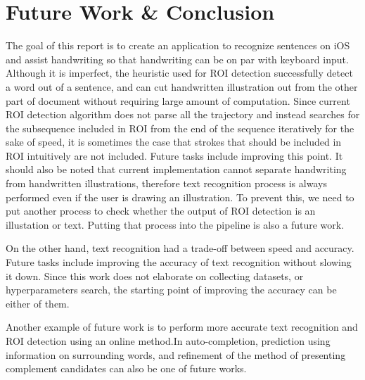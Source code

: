 \section{Future Work \& Conclusion}
\label{section:conclusion}

The goal of this report is to create an application to recognize sentences on iOS
and assist handwriting so that handwriting can be on par with keyboard input.
Although it is imperfect, the heuristic used for ROI detection successfully
detect a word out of a sentence, and can cut handwritten illustration out from the other
part of document without requiring large amount of computation. Since current ROI detection
algorithm does not parse all the trajectory and instead searches for the subsequence included
in ROI from the end of the sequence iteratively for the sake of speed, it is sometimes the case
that strokes that should be included in ROI intuitively are not included.
Future tasks include improving this point.
It should also be noted that current implementation cannot separate handwriting from handwritten illustrations,
therefore text recognition process is always performed even if the user is drawing an illustration.
To prevent this, we need to put another process to check whether the output of ROI detection is
an illustation or text. Putting that process into the pipeline is also a future work.

On the other hand, text recognition had a trade-off between speed and accuracy.
Future tasks include improving the accuracy of text recognition without slowing it down.
Since this work does not elaborate on collecting datasets, or hyperparameters search,
the starting point of improving the accuracy can be either of them.

Another example of future work is to perform more accurate text recognition and ROI detection
using an online method.In auto-completion, prediction using information on surrounding words,
and refinement of the method of presenting complement candidates can also be one of future works.
